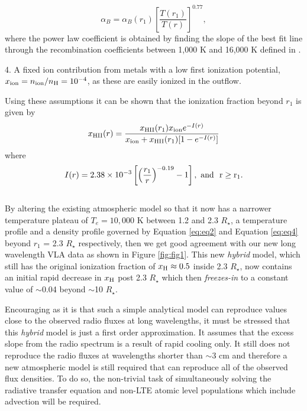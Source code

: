 \documentclass[iop]{emulateapj}
\begin{document}
\begin{equation}
\alpha _{B} = \alpha _{B}(r_{1})\left[\frac{T(r_1)}{T(r)}\right]^{0.77},
\label{eq:eq3}
\end{equation}
where the power law coefficient is obtained by finding the slope of the best fit line through the recombination coefficients between 1,000 K and 16,000 K defined in \cite{1978ppim.book.....S}.
\item 4. A fixed ion contribution from metals with a low first ionization potential, $x_{\rm{ion}}=n_{\rm{ion}}/n_{\rm{H}}=10^{-4}$, as these are easily ionized in the outflow.
\item Using these assumptions it can be shown that the ionization fraction beyond $r_{1}$ is given by \citep{1986ApJ...306..605G}
\begin{equation}
x_{\rm{HII}}(r)= \frac{x_{\rm{HII}}(r_1)x_{\rm{ion}}e^{-I(r)}}{x_{\rm{ion}}+x_{\rm{HII}}(r_1)[1 - e^{-I(r)}]}
\label{eq:eq4}
\end{equation}
where
\begin{equation}
I(r) = 2.38 \times 10^{-3} \left[\left( \frac{r_{1}}{r}\right)^{-0.19} -1 \right], \ \rm{and} \ \  r \geq r_{1}.
\label{eq:eq5}
\end{equation}
\\
By altering the existing atmospheric model so that it now has a narrower temperature  plateau of $T_e = 10,000$ K between 1.2 and 2.3 $R_{\star}$, a temperature profile and a density profile governed by Equation \ref{eq:eq2}  and Equation \ref{eq:eq4} beyond $r_{1}$ = 2.3 $R_{\star}$ respectively, then we get  good agreement with our new long wavelength VLA data as shown in Figure \ref{fig:fig1}. This new \textit{hybrid} model, which still has the original ionization fraction of $x_{\rm{H}} \approx 0.5$ inside 2.3 $R_{\star}$, now contains an  initial rapid decrease in $x_{\rm{H}}$ post 2.3 $R_{\star}$ which then \textit{freezes-in} to a constant value of $\sim$0.04 beyond $\sim$10 $R_{\star}$.

Encouraging as it is that such a simple analytical model can reproduce values close to the observed radio fluxes at long wavelengths, it must be stressed that this \textit{hybrid} model is just a first order approximation. It assumes that the excess slope from the radio spectrum is a result of rapid cooling only. It still does not reproduce the radio fluxes at wavelengths shorter than $\sim$3 cm and therefore a new atmospheric model is still required that can reproduce all of the observed flux densities. To do so, the non-trivial task of simultaneously solving the radiative transfer equation and non-LTE atomic level populations which include advection will be required.
\end{document}
